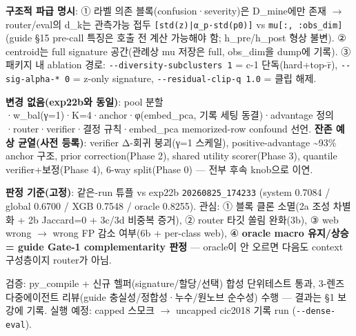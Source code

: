 \textbf{구조적 파급 명시}: ① 라벨 의존 블록(confusion·severity)은 D\_\allowbreak{}mine에만 존재  \ensuremath{\rightarrow}  router/\allowbreak{}eval의 d\_\allowbreak{}k는 관측가능 접두 \texttt{[std(z)|\allowbreak{}α\_\allowbreak{}\allowbreak{}p·std(\allowbreak{}p0)]} vs \texttt{mu[:,\allowbreak{} :o\allowbreak{}bs\_\allowbreak{}\allowbreak{}dim]} (guide §15 pre-call 특징은 호출 전 계산 가능해야 함; h\_\allowbreak{}pre/\allowbreak{}h\_\allowbreak{}post 형상 불변). ② centroid는 full signature 공간(관례상 mu 저장은 full, obs\_\allowbreak{}dim을 dump에 기록). ③ 패키지 내 ablation 경로: \texttt{-\allowbreak{}-\allowbreak{}divers\allowbreak{}ity-\allowbreak{}subc\allowbreak{}lusters \allowbreak{}1} =\allowbreak{} c-1 단독(hard+\allowbreak{}top-r̄), \texttt{-\allowbreak{}-\allowbreak{}sig-\allowbreak{}al\allowbreak{}pha-\allowbreak{}* 0} =\allowbreak{} z-only signature, \texttt{-\allowbreak{}-\allowbreak{}residu\allowbreak{}al-\allowbreak{}clip-\allowbreak{}q 1.\allowbreak{}0} =\allowbreak{} 클립 해제.

\textbf{변경 없음(exp22b와 동일)}: pool 분할·w\_\allowbreak{}bal(γ=\allowbreak{}1)·K=\allowbreak{}4·anchor·φ(embed\_\allowbreak{}pca, 기록 세팅 동결)·advantage 정의·router·verifier·결정 규칙·embed\_\allowbreak{}pca memorized-row confound 선언. \textbf{잔존 예상 균열(사전 등록)}: verifier Δ-회귀 붕괴(γ=\allowbreak{}1 스케일), positive-advantage \textasciitilde{}93\% anchor 구조, prior correction(Phase 2), shared utility scorer(Phase 3), quantile verifier+\allowbreak{}보정(Phase 4), 6-way split(Phase 0) — 전부 후속 knob으로 이연.

\textbf{판정 기준(고정)}: 같은-run 튜플 vs exp22b \texttt{20260825\allowbreak{}\_\allowbreak{}\allowbreak{}174233} (system 0.7084 /\allowbreak{} global 0.6700 /\allowbreak{} XGB 0.7548 /\allowbreak{} oracle 0.8255). 관심: ① 블록 클론 소멸(2a 조성 차별화 +\allowbreak{} 2b Jaccard=\allowbreak{}0 +\allowbreak{} 3c/\allowbreak{}3d 비중복 증거), ② router 타깃 쏠림 완화(3b), ③ web wrong \ensuremath{\rightarrow} wrong FP 감소 여부(6b +\allowbreak{} per-class web), ④ \textbf{oracle macro 유지/\allowbreak{}상승 =\allowbreak{} guide Gate-1 complementarity 판정} — oracle이 안 오르면 다음도 context 구성층이지 router가 아님.

검증: py\_\allowbreak{}compile +\allowbreak{} 신규 헬퍼(signature/\allowbreak{}할당/\allowbreak{}선택) 합성 단위테스트 통과, 3-렌즈 다중에이전트 리뷰(guide 충실성/\allowbreak{}정합성·누수/\allowbreak{}원노브 순수성) 수행 — 결과는 §1 보강에 기록. 실행 예정: capped 스모크  \ensuremath{\rightarrow}  uncapped cic2018 기록 run (\texttt{-\allowbreak{}-\allowbreak{}dense-\allowbreak{}eval}).

